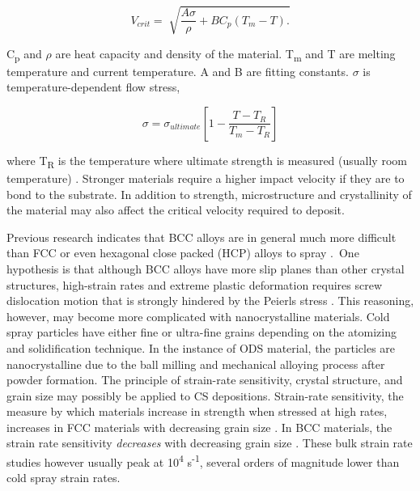 		\begin{equation}
			V_{crit}=\sqrt[]{\frac{A \sigma }{ \rho }+BC_{p} \left( T_{m}-T \right). }
		\end{equation}
		
		
		C\textsubscript{p }and \(   \rho   \) are heat capacity and density of the material. T\textsubscript{m} and T are melting temperature and current temperature. A and B are fitting constants.  \(  \sigma  \)  is temperature-dependent flow stress,
		
		
		\begin{equation}
		  \sigma = \sigma _{ultimate} \left[ 1-\frac{T-T_{R}}{T_{m}-T_{R}} \right]
 		\end{equation}
		
		
		
		where T\textsubscript{R} is the temperature where ultimate strength is measured (usually room temperature) \cite{RN1685}. Stronger materials require a higher impact velocity if they are to bond to the substrate. In addition to strength, microstructure and crystallinity of the material may also affect the critical velocity required to deposit.
		
		
		
		Previous research indicates that BCC alloys are in general much more difficult than FCC or even hexagonal close packed (HCP) alloys to spray \cite{RN559, RN1383, RN155, RN180, RN183, RN451, RN179}.\ One  hypothesis is that although BCC alloys have more slip planes than other crystal structures, high-strain rates and extreme plastic deformation requires screw dislocation motion that is strongly hindered by the Peierls stress \cite{RN1375}. This reasoning, however, may become more complicated with nanocrystalline materials. Cold spray particles have either fine or ultra-fine grains depending on the atomizing and solidification technique. In the instance of ODS material, the particles are nanocrystalline due to the ball milling and mechanical alloying process after powder formation. The principle of strain-rate sensitivity, crystal structure, and grain size may possibly be applied to CS depositions. Strain-rate sensitivity, the measure by which materials increase in strength when stressed at high rates, increases in FCC materials with decreasing grain size \cite{RN3410}. In BCC materials, the strain rate sensitivity \textit{decreases} with decreasing grain size \cite{RN3411}. These bulk strain rate studies however usually peak at 10\textsuperscript{4} s\textsuperscript{-1}, several orders of magnitude lower than cold spray strain rates.
		
